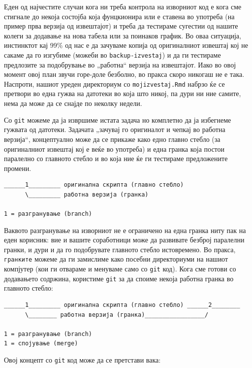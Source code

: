 \documentclass[
]{book}
\begin{document}
Еден од најчестите случаи кога ни треба контрола на изворниот код е кога сме стигнале до некоја состојба која фунцкионира или е ставена во употреба (на пример прва верзија од извештајот) и треба да тестираме сугестии од нашите колеги за додавање на нова табела или за поинаков график. Во оваа ситуација, инстинктот кај 99\% од нас е да зачуваме копија од оригиналниот извештај кој не сакаме да го изгубиме (можеби во \texttt{backup-izvestaj}) и да ги тестираме предлозите за подобрување во „работна`` верзија на извештајот. Иако во овој момент овој план звучи горе-доле безболно, во пракса скоро никогаш не е така. Наспроти, нашиот уреден директориум со \texttt{mojizvestaj.Rmd} набрзо ќе се претвори во една гужва на датотеки во која што никој, па дури ни ние самите, нема да може да се снајде по неколку недели.

Со \texttt{git} можеме да ја извршиме истата задача но комплетно да ја избегнеме гужвата од датотеки. Задачата „зачувај го оригиналот и чепкај во работна верзија``, концептуално може да се прикаже како едно главно стебло (за оригиналниот извештај кој е веќе во употреба) и една гранка која постои паралелно со главното стебло и во која ние ќе ги тестираме предложените промени.

\begin{verbatim}
______1_________ оригинална скрипта (главно стебло)
      \_________ работна верзија (гранка)

1 = разгранување (branch)      
\end{verbatim}

Ваквото разгранување на изворниот не е ограничено на една гранка ниту пак на еден корисник: вие и вашите соработници може да развивате безброј паралелни гранки, и дури и да го подобрувате главното стебло истовремено. Во пракса, \texttt{гранките} можеме да ги замислиме како посебни директориуми на нашиот компјутер (кои ги отвараме и менуваме само со \texttt{git} код). Кога сме готови со додавањето содржина, користиме \texttt{git} за да споиме некоја работна гранка во главното стебло:

\begin{verbatim}
______1_________ оригинална скрипта (главно стебло) ______2________
      \________ работна верзија (гранка)_________________/
      
1 = разгранување (branch)      
1 = спојување (merge)      
\end{verbatim}

Овој концепт со \texttt{git} код може да се претстави вака:
\end{document}
